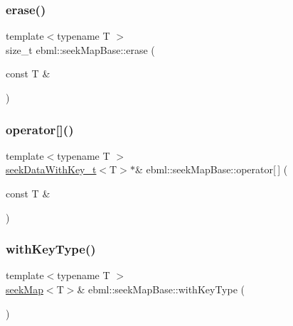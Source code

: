 \mbox{\label{classebml_1_1seekMapBase_abeda7aee2215f0aec47e8ff0d607a902}} 
\subsubsection{\texorpdfstring{erase()}{erase()}}
{\footnotesize\ttfamily template$<$typename T $>$ \\
size\+\_\+t ebml\+::seek\+Map\+Base\+::erase (\begin{DoxyParamCaption}\item[{const T \&}]{ }\end{DoxyParamCaption})}

\mbox{\label{classebml_1_1seekMapBase_ac2f1f5151d43f5a9c04adc835fdc456f}} 
\subsubsection{\texorpdfstring{operator[]()}{operator[]()}}
{\footnotesize\ttfamily template$<$typename T $>$ \\
\mbox{\hyperlink{classebml_1_1seekDataWithKey__t}{seek\+Data\+With\+Key\+\_\+t}}$<$T$>$$\ast$\& ebml\+::seek\+Map\+Base\+::operator\mbox{[}$\,$\mbox{]} (\begin{DoxyParamCaption}\item[{const T \&}]{ }\end{DoxyParamCaption})}

\mbox{\label{classebml_1_1seekMapBase_ad313f809e97617d93b23191d03805492}} 
\subsubsection{\texorpdfstring{with\+Key\+Type()}{withKeyType()}\hspace{0.1cm}{\footnotesize\ttfamily [1/2]}}
{\footnotesize\ttfamily template$<$typename T $>$ \\
\mbox{\hyperlink{classebml_1_1seekMap}{seek\+Map}}$<$T$>$\& ebml\+::seek\+Map\+Base\+::with\+Key\+Type (\begin{DoxyParamCaption}{ }\end{DoxyParamCaption})}

